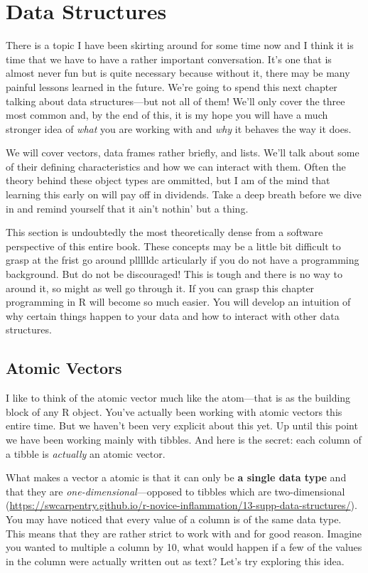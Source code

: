 \documentclass[
]{book}
\begin{document}
\hypertarget{data-structures}{%
\chapter{Data Structures}\label{data-structures}}

There is a topic I have been skirting around for some time now and I think it is time that we have to have a rather important conversation. It's one that is almost never fun but is quite necessary because without it, there may be many painful lessons learned in the future. We're going to spend this next chapter talking about data structures---but not all of them! We'll only cover the three most common and, by the end of this, it is my hope you will have a much stronger idea of \emph{what} you are working with and \emph{why} it behaves the way it does.

We will cover vectors, data frames rather briefly, and lists. We'll talk about some of their defining characteristics and how we can interact with them. Often the theory behind these object types are ommitted, but I am of the mind that learning this early on will pay off in dividends. Take a deep breath before we dive in and remind yourself that it ain't nothin' but a thing.

This section is undoubtedly the most theoretically dense from a software perspective of this entire book. These concepts may be a little bit difficult to grasp at the frist go around pllllldc articularly if you do not have a programming background. But do not be discouraged! This is tough and there is no way to around it, so might as well go through it. If you can grasp this chapter programming in R will become so much easier. You will develop an intuition of why certain things happen to your data and how to interact with other data structures.

\hypertarget{atomic-vectors}{%
\section{Atomic Vectors}\label{atomic-vectors}}

I like to think of the atomic vector much like the atom---that is as the building block of any R object. You've actually been working with atomic vectors this entire time. But we haven't been very explicit about this yet. Up until this point we have been working mainly with tibbles. And here is the secret: each column of a tibble is \emph{actually} an atomic vector.

What makes a vector a atomic is that it can only be \textbf{a single data type} and that they are \emph{one-dimensional}---opposed to tibbles which are two-dimensional (\url{https://swcarpentry.github.io/r-novice-inflammation/13-supp-data-structures/}). You may have noticed that every value of a column is of the same data type. This means that they are rather strict to work with and for good reason. Imagine you wanted to multiple a column by 10, what would happen if a few of the values in the column were actually written out as text? Let's try exploring this idea.
\end{document}
